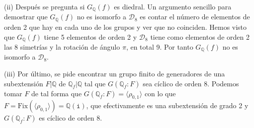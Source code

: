 (ii) Después se pregunta si $G_\mathbb{Q}(f)$ es diedral. Un argumento sencillo para demostrar que  $G_\mathbb{Q}(f)$ no es isomorfo a $\mathscr{D}_8$ es contar el número de elementos de orden 2 que hay en cada uno de los grupos y ver que no coinciden. Hemos visto que $G_\mathbb{Q}(f)$ tiene 5 elementos de orden 2 y $\mathscr{D}_8$ tiene como elementos de orden 2 las 8 simetrías y la rotación de ángulo $\pi$, en total 9. Por tanto $G_\mathbb{Q}(f)$ no es isomorfo a $\mathscr{D}_8$. 

(iii) Por último, se pide encontrar un grupo finito de generadores de una subextensión $F|\mathbb{Q}$ de $\mathbb{Q}_f|\mathbb{Q}$ tal que $G(\mathbb{Q}_f:F)$ sea cíclico de orden 8. Podemos tomar $F$ de tal forma que $G(\mathbb{Q}_f:F)=\langle\rho_{0,1}\rangle$ con lo que $F=\mathrm{Fix}(\langle\rho_{0,1}\rangle)=\mathbb{Q}(\mathtt{i})$, que efectivamente es una subextensión de grado 2 y $G(\mathbb{Q}_f:F)$ es cíclico de orden 8.